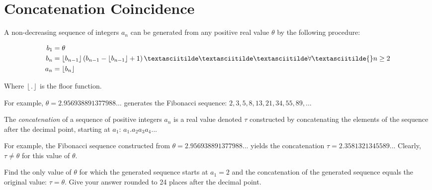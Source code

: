 \section[Problem \#751: Concatenation Coincidence]{Concatenation Coincidence}
\label{sec:problem_751}

A non-decreasing sequence of integers $a_n$ can be
generated from any positive real value $\theta$ by the
following procedure:

\begin{align}
\begin{split}
b_1 &= \theta \\
b_n &= \left\lfloor b_{n-1}
\right\rfloor \left(b_{n-1}
- \left\lfloor b_{n-1}
\right\rfloor +
1\right)\textasciitilde\textasciitilde\textasciitilde\forall
\textasciitilde{} n \geq 2 \\
a_n &= \left\lfloor b_{n}
\right\rfloor \end{split}
\end{align}

Where $\left\lfloor . \right\rfloor$ is the floor function.

For example, $\theta=2.956938891377988...$ generates the Fibonacci sequence:
$2, 3, 5, 8, 13, 21, 34, 55, 89, ...$

The \emph{concatenation} of a sequence of positive integers
$a_n$ is a real value denoted $\tau$
constructed by concatenating the elements of the sequence after the
decimal point, starting at $a_1$: $a_1.a_2a_3a_4...$

For example, the Fibonacci sequence constructed from
$\theta=2.956938891377988...$ yields the concatenation $\tau=2.3581321345589...$
Clearly, $\tau \neq \theta$ for this value of $\theta$.

Find the only value of $\theta$ for which the generated
sequence starts at $a_1=2$ and the concatenation of the
generated sequence equals the original value: $\tau = \theta$.
Give your answer rounded to 24 places after the decimal point.